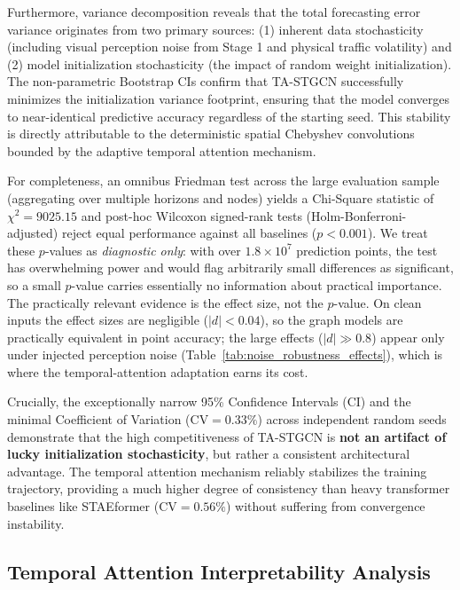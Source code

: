 \documentclass[journal,twocolumn]{IEEEtran}
\begin{document}
Furthermore, variance decomposition reveals that the total forecasting error variance originates from two primary sources: (1) inherent data stochasticity (including visual perception noise from Stage 1 and physical traffic volatility) and (2) model initialization stochasticity (the impact of random weight initialization). The non-parametric Bootstrap CIs confirm that TA-STGCN successfully minimizes the initialization variance footprint, ensuring that the model converges to near-identical predictive accuracy regardless of the starting seed. This stability is directly attributable to the deterministic spatial Chebyshev convolutions bounded by the adaptive temporal attention mechanism.

For completeness, an omnibus Friedman test across the large evaluation sample (aggregating over multiple horizons and nodes) yields a Chi-Square statistic of $\chi^2 = 9025.15$ and post-hoc Wilcoxon signed-rank tests (Holm-Bonferroni-adjusted) reject equal performance against all baselines ($p < 0.001$). We treat these $p$-values as \emph{diagnostic only}: with over $1.8 \times 10^7$ prediction points, the test has overwhelming power and would flag arbitrarily small differences as significant, so a small $p$-value carries essentially no information about practical importance. The practically relevant evidence is the effect size, not the $p$-value. On clean inputs the effect sizes are negligible ($|d| < 0.04$), so the graph models are practically equivalent in point accuracy; the large effects ($|d| \gg 0.8$) appear only under injected perception noise (Table~\ref{tab:noise_robustness_effects}), which is where the temporal-attention adaptation earns its cost.

Crucially, the exceptionally narrow 95\% Confidence Intervals (CI) and the minimal Coefficient of Variation ($\text{CV} = 0.33\%$) across independent random seeds demonstrate that the high competitiveness of TA-STGCN is \textbf{not an artifact of lucky initialization stochasticity}, but rather a consistent architectural advantage. The temporal attention mechanism reliably stabilizes the training trajectory, providing a much higher degree of consistency than heavy transformer baselines like STAEformer ($\text{CV} = 0.56\%$) without suffering from convergence instability.



\subsection{Temporal Attention Interpretability Analysis}
\label{sec:attention_explainability}
\end{document}
